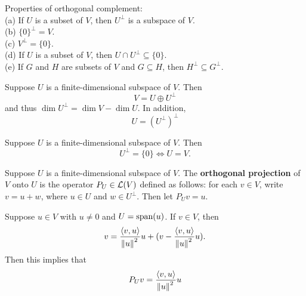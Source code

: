 \documentclass{extarticle}
\begin{document}
\begin{corollary}
    Properties of orthogonal complement: \\  
    (a) If \(U\) is a subset of \(V\), then \(U^\perp\) is a subspace of \(V\). \\ 
    (b) \(\{0\}^\perp = V\). \\ 
    (c) \(V^\perp = \{0\}\). \\ 
    (d) If \(U\) is a subset of \(V\), then \(U \cap U^\perp \subseteq \{0\}\). \\ 
    (e) If \(G\) and \(H\) are subsets of \(V\) and \(G \subseteq H\), then \(H^\perp \subseteq G^\perp\).
\end{corollary}

\begin{corollary}
    Suppose \(U\) is a finite-dimensional subspace of \(V\). Then 
    \[V = U \oplus U^\perp\]
    and thus \(\dim U^\perp = \dim V - \dim U\). In addition, 
    \[U = (U^\perp)^\perp\]
\end{corollary}

\begin{corollary}
    Suppose \(U\) is a finite-dimensional subspace of \(V\). Then 
    \[U^\perp = \{0\} \Leftrightarrow U = V.\]
\end{corollary}

\begin{definition}
    Suppose \(U\) is a finite-dimensional subspace of \(V\). The \textbf{orthogonal projection} of \(V\) 
    onto \(U\) is the operator \(P_U \in \mathcal{L}(V)\) defined as follows: for each \(v \in V\), write \(v = u + w\), 
    where \(u \in U\) and \(w \in U^\perp\). Then let \(P_U v = u\).
\end{definition}

\begin{remark}
    Suppose \(u \in V\) with \(u \neq 0\) and \(U = \text{span}(u)\). If \(v \in V\), then 
    \[v = \frac{\langle v,u \rangle}{\norm{u}^2}u + (v - \frac{\langle v,u \rangle}{\norm{u}^2}u).\]
    Then this implies that 
    \[P_U v = \frac{\langle v,u \rangle}{\norm{u}^2}u\]
\end{remark}
\end{document}
